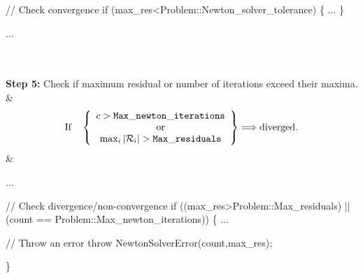 \begin{longtabu}
\begin{DoxyCode}
\textcolor{comment}{// Check convergence}
if (max\_res<Problem::Newton\_solver\_tolerance)
\{
   ...
\}

... 
\end{DoxyCode}
   \\
\\
{\bfseries Step 5\+:} Check if maximum residual or number of iterations exceed their maxima.  &\[ \mbox{If \ \ } \left\{ \begin{array}{c} c > {\tt Max\_newton\_iterations} \\ \mbox{ or } \\ \max_i |{\cal R}_i| > {\tt Max\_residuals} \end{array} \right\} \Longrightarrow \mbox{diverged.} \]  &
\begin{DoxyCode}
...

\textcolor{comment}{// Check divergence/non-convergence}
if ((max\_res>Problem::Max\_residuals) ||
    (count == Problem::Max\_newton\_iterations))
\{
   ...

   \textcolor{comment}{// Throw an error}
   \textcolor{keywordflow}{throw} NewtonSolverError(count,max\_res);

\}


\end{DoxyCode}
\end{longtabu}

